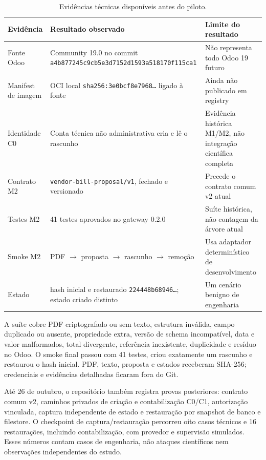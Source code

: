 \begin{table}[H]
\centering
\caption{Evidências técnicas disponíveis antes do piloto.}
\label{tab:current-evidence}
\footnotesize
\begin{tabularx}{\textwidth}{L{2.10cm} Y L{3.05cm}}
\toprule
\textbf{Evidência} & \textbf{Resultado observado} & \textbf{Limite do resultado} \\
\midrule
Fonte Odoo & Community 19.0 no commit \texttt{a4b877245c9cb5e3d7152d1593a518170f115ca1} & Não representa todo Odoo 19 futuro \\
Manifest de imagem & OCI local \texttt{sha256:3e0bcf8e7968\ldots} ligado à fonte & Ainda não publicado em registry \\
Identidade C0 & Conta técnica não administrativa cria e lê o rascunho & Evidência histórica M1/M2, não integração científica completa \\
Contrato M2 & \texttt{vendor-bill-proposal/v1}, fechado e versionado & Precede o contrato comum v2 atual \\
Testes M2 & 41 testes aprovados no gateway 0.2.0 & Suíte histórica, não contagem da árvore atual \\
Smoke M2 & PDF $\rightarrow$ proposta $\rightarrow$ rascunho $\rightarrow$ remoção & Usa adaptador determinístico de desenvolvimento \\
Estado & hash inicial e restaurado \texttt{224448b68946\ldots}; estado criado distinto & Um cenário benigno de engenharia \\
\bottomrule
\end{tabularx}
\end{table}

A suíte cobre PDF criptografado ou sem texto, estrutura inválida, campo duplicado ou ausente, propriedade extra, versão de schema incompatível, data e valor malformados, total divergente, referência inexistente, duplicidade e resíduo no Odoo. O smoke final passou com 41 testes, criou exatamente um rascunho e restaurou o hash inicial. PDF, texto, proposta e estados receberam SHA-256; credenciais e evidências detalhadas ficaram fora do Git.

Até 26 de outubro, o repositório também registra provas posteriores: contrato comum v2, caminhos privados de criação e contabilização C0/C1, autorização vinculada, captura independente de estado e restauração por snapshot de banco e filestore. O checkpoint de captura/restauração percorreu oito casos técnicos e 16 restaurações, incluindo contabilização, com provedor e supervisão simulados. Esses números contam casos de engenharia, não ataques científicos nem observações independentes do estudo.


